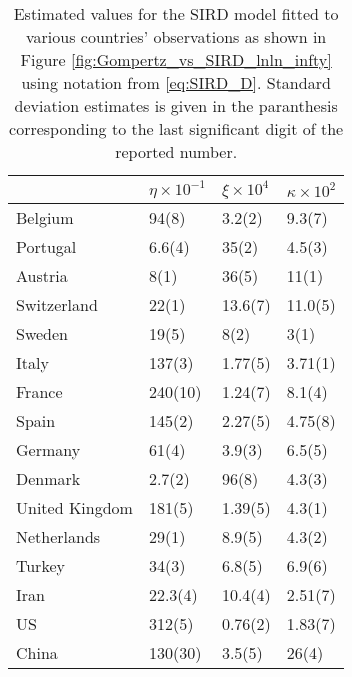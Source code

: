 \documentclass{article}
\begin{document}
\begin{table}[H]
\label{tab:sird}
\centering
\caption{Estimated values for the SIRD model fitted to various countries' observations as shown in Figure \ref{fig:Gompertz_vs_SIRD_lnln_infty} using notation from \ref{eq:SIRD_D}. Standard deviation estimates is given in the paranthesis corresponding to the last significant digit of the reported number.}
\begin{tabular}{llll}
\toprule
{} &           $\eta\times 10^{-1}$ &      $\xi \times 10^{4}$ &            $\kappa\times 10^{2}$ \\
\midrule
Belgium        &    94(8) &   3.2(2) &   9.3(7) \\
Portugal       &   6.6(4) &    35(2) &   4.5(3) \\
Austria        &     8(1) &    36(5) &    11(1) \\
Switzerland    &    22(1) &  13.6(7) &  11.0(5) \\
Sweden         &    19(5) &     8(2) &     3(1) \\
Italy          &   137(3) &  1.77(5) &  3.71(1) \\
France         &  240(10) &  1.24(7) &   8.1(4) \\
Spain          &   145(2) &  2.27(5) &  4.75(8) \\
Germany        &    61(4) &   3.9(3) &   6.5(5) \\
Denmark        &   2.7(2) &    96(8) &   4.3(3) \\
United Kingdom &   181(5) &  1.39(5) &   4.3(1) \\
Netherlands    &    29(1) &   8.9(5) &   4.3(2) \\
Turkey         &    34(3) &   6.8(5) &   6.9(6) \\
Iran           &  22.3(4) &  10.4(4) &  2.51(7) \\
US             &   312(5) &  0.76(2) &  1.83(7) \\
China          &  130(30) &   3.5(5) &    26(4) \\
\bottomrule
\end{tabular}

\end{table}
\end{document}
